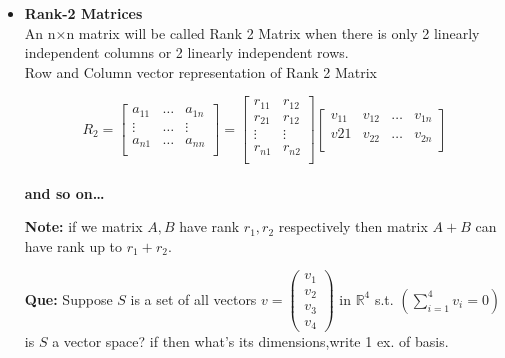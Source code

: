 \documentclass[a4paper,11pt]{article}
\numberwithin{equation}{section}
\begin{document}
\begin{itemize}
        \item \textbf{Rank-2 Matrices}
        \vspace{5pt}\\
        An n×n matrix will be called Rank 2 Matrix when there is only 2 linearly independent columns or 2 linearly independent rows.\\
        \hspace{0.5cm} Row and Column vector representation of Rank 2 Matrix
        \vspace{5pt}
        \begin{center}
            \[R_2=
                \begin{bmatrix}
                    a_{11} & \dots & a_{1n}\\
                    \vdots & \dots & \vdots \\
                    a_{n1} & \dots & a_{nn}\\
                \end{bmatrix}=
                \begin{bmatrix}
                    r_{11} & r_{12}\\
                    r_{21} & r_{12}\\
                    \vdots &  \vdots\\
                    r_{n1} & r_{n2}\\
                \end{bmatrix}
                \begin{bmatrix}
                    v_{11} & v_{12} & \dots & v_{1n}\\
                    v{21}  & v_{22} & \dots & v_{2n}\\
                \end{bmatrix}
            \]\\
            \vspace{10pt}
            \textbf{and so on\dots}
        \end{center}
\textbf{Note: }if we matrix $A,B$ have rank $r_1,r_2$ respectively then matrix $A+B$ can have rank up to $r_1+r_2$.


\textbf{Que: }Suppose $S$ is a set of all vectors $v=\begin{pmatrix}
    v_1\\v_2\\v_3\\v_4
\end{pmatrix}$ in $\mathbb{R}^4$ s.t. $\left(\sum_{i=1}^{4}v_i=0\right)$ is $S$ a vector space? if then what's its dimensions,write 1 ex. of basis.


\end{itemize}
\end{document}
